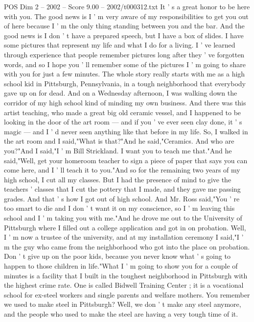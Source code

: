 \begin{textsample}{POS Dim 2 – 2002 – Score 9.00 – 2002/t000312.txt}  \label{ex:f2_pos_056}
It ' s a great honor to be here with you.
The good news is I ' m very aware of my responsibilities to get you out of here because I ' m the only thing standing between you and the bar.
And the good news is I don ' t have a prepared speech, but I have a box of slides.
I have some pictures that represent my life and what I do for a living.
I ' ve learned through experience that people remember pictures long after they ' ve forgotten words, and so I hope you ' ll remember some of the pictures I ' m going to share with you for just a few minutes.
The whole story really starts with me as a high school kid in Pittsburgh, Pennsylvania, in a tough neighborhood that everybody gave up on for dead.
And on a Wednesday afternoon, I was walking down the corridor of my high school kind of minding my own business.
And there was this artist teaching, who made a great big old ceramic vessel, and I happened to be looking in the door of the art room — and if you ' ve ever seen clay done, it ' s magic — and I ' d never seen anything like that before in my life.
So, I walked in the art room and I said,"What is that?"And he said,"Ceramics.
And who are you?"And I said,"I ' m Bill Strickland.
I want you to teach me that."And he said,"Well, get your homeroom teacher to sign a piece of paper that says you can come here, and I ' ll teach it to you."And so for the remaining two years of my high school, I cut all my classes.
But I had the presence of mind to give the teachers ' classes that I cut the pottery that I made, and they gave me passing grades.
And that ' s how I got out of high school.
And Mr.
Ross said,"You ' re too smart to die and I don ' t want it on my conscience, so I ' m leaving this school and I ' m taking you with me."And he drove me out to the University of Pittsburgh where I filled out a college application and got in on probation.
Well, I ' m now a trustee of the university, and at my installation ceremony I said,"I ' m the guy who came from the neighborhood who got into the place on probation.
Don ' t give up on the poor kids, because you never know what ' s going to happen to those children in life."What I ' m going to show you for a couple of minutes is a facility that I built in the toughest neighborhood in Pittsburgh with the highest crime rate.
One is called Bidwell Training Center ; it is a vocational school for ex-steel workers and single parents and welfare mothers.
You remember we used to make steel in Pittsburgh?
Well, we don ' t make any steel anymore, and the people who used to make the steel are having a very tough time of it.

\end{textsample}
